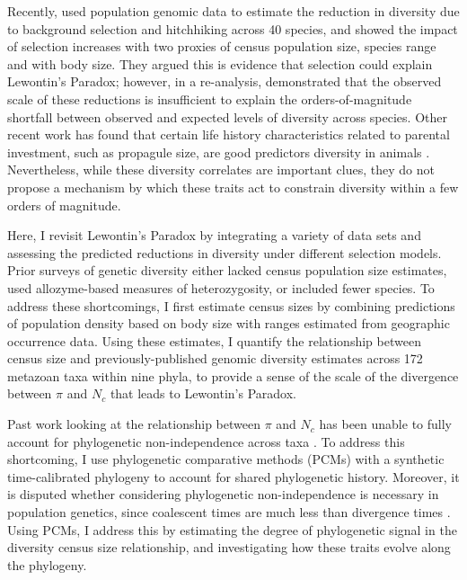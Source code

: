 \documentclass[11pt]{article}
\begin{document}
Recently, \textcite{Corbett-Detig2015-gt} used population genomic data to
estimate the reduction in diversity due to background selection and hitchhiking
across 40 species, and showed the impact of selection increases with two
proxies of census population size, species range and with body size. They
argued this is evidence that selection could explain Lewontin's Paradox;
however, in a re-analysis, \textcite{Coop2016-gx} demonstrated that the
observed scale of these reductions is insufficient to explain the
orders-of-magnitude shortfall between observed and expected levels of diversity
across species. Other recent work has found that certain life history
characteristics related to parental investment, such as propagule size, are
good predictors diversity in animals \parencite{Romiguier2014-bp,Chen2017-nf}.
Nevertheless, while these diversity correlates are important clues, they do not
propose a mechanism by which these traits act to constrain diversity within a
few orders of magnitude. 

Here, I revisit Lewontin's Paradox by integrating a variety of data sets and
assessing the predicted reductions in diversity under different selection
models. Prior surveys of genetic diversity either lacked census population size
estimates, used allozyme-based measures of heterozygosity, or included fewer
species. To address these shortcomings, I first estimate census sizes by
combining predictions of population density based on body size with ranges
estimated from geographic occurrence data. Using these estimates, I quantify
the relationship between census size and previously-published genomic diversity
estimates across 172 metazoan taxa within nine phyla, to provide a sense of the
scale of the divergence between $\pi$ and $N_c$ that leads to Lewontin's
Paradox. 

Past work looking at the relationship between $\pi$ and $N_c$ has been unable
to fully account for phylogenetic non-independence across taxa
\parencite{Felsenstein1985-an}. To address this shortcoming, I use phylogenetic
comparative methods (PCMs) with a synthetic time-calibrated phylogeny to
account for shared phylogenetic history. Moreover, it is disputed whether
considering phylogenetic non-independence is necessary in population genetics,
since coalescent times are much less than divergence times
\parencite{Whitney2010-ud,Lynch2011-qv}. Using PCMs, I address this by
estimating the degree of phylogenetic signal in the diversity census size
relationship, and investigating how these traits evolve along the phylogeny.
\end{document}
